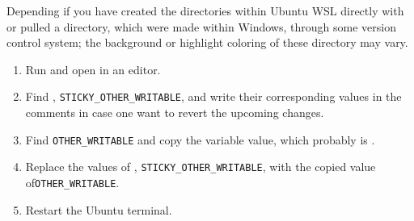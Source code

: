 
Depending if you have created the directories within Ubuntu WSL directly with  or pulled a directory,
which were made within Windows, through some version control system; the background or highlight coloring
of these directory may vary.

\begin{enumerate}
    \item Run  and open  in an editor.
    
    \item Find , \texttt{STICKY_OTHER_WRITABLE},  and write their corresponding values in the
    comments in case one want to revert the upcoming changes.
    
    \item Find \texttt{OTHER_WRITABLE} and copy the variable value, which probably is .
    
    \item Replace the values of , \texttt{STICKY_OTHER_WRITABLE},  with the copied value of\texttt{OTHER_WRITABLE}.
    
    \item Restart the Ubuntu terminal.
\end{enumerate}